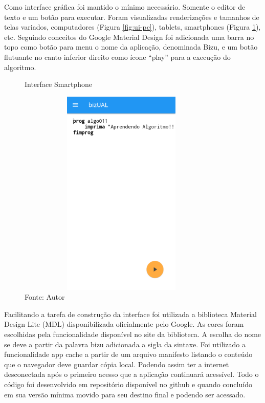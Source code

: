 Como interface gráfica foi mantido o mínimo necessário. Somente o editor de texto e um botão para executar. Foram visualizadas renderizações e tamanhos de telas variados, computadores (Figura \ref{fig:ui-pc}), tablets, smartphones (Figura \ref{fig:ui-phone}), etc. Seguindo conceitos do Google Material Design foi adicionada uma barra no topo como botão para menu o nome da aplicação, denominada Bizu, e um botão flutuante no canto inferior direito como ícone ``play'' para a execução do algoritmo.

\begin{figure}[h]
  \caption{Interface Smartphone}\label{fig:ui-phone}
  \centering
  \includegraphics[width=10cm,height=10cm,keepaspectratio]{figures/bizual-smartphone.pdf}
  \caption*{\footnotesize Fonte: Autor}
\end{figure}

Facilitando a tarefa de construção da interface foi utilizada a biblioteca Material Design Lite (MDL) disponibilizada oficialmente pelo Google. As cores foram escolhidas pela funcionalidade disponível no site da biblioteca.
A escolha do nome se deve a partir da palavra bizu adicionada a sigla da sintaxe.
Foi utilizado a funcionalidade app cache a partir de um arquivo manifesto listando o conteúdo que o navegador deve guardar cópia local. Podendo assim ter a internet desconectada após o primeiro acesso que a aplicação continuará acessível.
Todo o código foi desenvolvido em repositório disponível no github e quando concluído em sua versão mínima movido para seu destino final e podendo ser acessado.\color{black}

